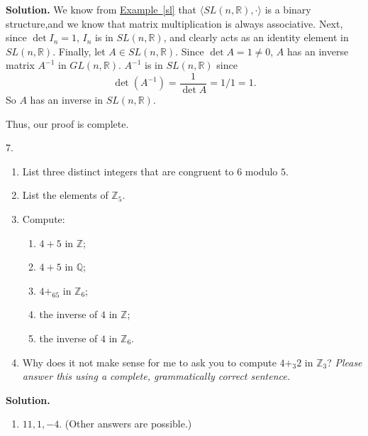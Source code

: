\documentclass[10pt,]{book}
\theoremstyle{plain}
\theoremstyle{definition}
\theoremstyle{definition}
\theoremstyle{definition}
\theoremstyle{definition}
\numberwithin{equation}{section}
\def\Z{\mathbb{Z}}
\def\R{\mathbb{R}}
\def\Q{\mathbb{Q}}
\begin{document}
\begin{exerciselist}
\par\smallskip
\par\smallskip
\noindent\textbf{Solution.}\hypertarget{solution-17}{}\quad
We know from \hyperref[sl]{Example~\ref{sl}} that \(\langle SL(n,\R),\cdot\rangle\) is a binary structure,and we know that matrix multiplication is always associative. Next, since \(\det I_n=1\), \(I_n\) is in \(SL(n,\R)\), and clearly acts as an identity element in \(SL(n,\R)\). Finally, let \(A\in SL(n,\R)\).  Since \(\det A=1\neq 0\), \(A\) has an inverse matrix \(A^{-1}\) in \(GL(n, \R)\).  \(A^{-1}\) is in \(SL(n,\R)\) since%
\begin{equation*}
\det(A^{-1})=\frac{1}{\det A}=1/1=1.
\end{equation*}
So \(A\) has an inverse in \(SL(n,\R)\).%
\par
Thus, our proof is complete.%
\item[7.]\hypertarget{exercise-18}{}\leavevmode%
\begin{enumerate}[label=(\alph*)]
\item\hypertarget{li-123}{}List three distinct integers that are congruent to \(6\) modulo \(5\).%
\item\hypertarget{li-124}{}List the elements of \(\Z_5\).%
\item\hypertarget{li-125}{}Compute: %
\begin{enumerate}[label=\roman*.]
\item\hypertarget{li-126}{}\(4+5\) in \(\Z\);%
\item\hypertarget{li-127}{}\(4+5\) in \(\Q\);%
\item\hypertarget{li-128}{}\(4+_65\) in \(\Z_6\);%
\item\hypertarget{li-129}{}the inverse of \(4\) in \(\Z\);%
\item\hypertarget{li-130}{}the inverse of \(4\) in \(\Z_6\).%
\end{enumerate}
%
\item\hypertarget{li-131}{}Why does it not make sense for me to ask you to compute \(4+_3 2\) in \(\Z_3\)? \emph{Please answer this using a complete, grammatically correct sentence.}%
\end{enumerate}
%
\par\smallskip
\par\smallskip
\noindent\textbf{Solution.}\hypertarget{solution-18}{}\quad
\leavevmode%
\begin{enumerate}[label=(\alph*)]
\item\hypertarget{li-132}{}\(11, 1, -4\). (Other answers are possible.)%

\end{enumerate}
\end{exerciselist}
\end{document}
